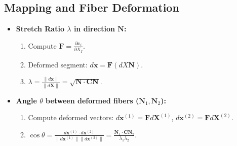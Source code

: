 \documentclass[10pt,twocolumn, a4paper]{article}
\begin{document}
\subsection{Mapping and Fiber Deformation}
\begin{itemize}
    \item \textbf{Stretch Ratio $\lambda$ in direction $\bm{N}$:}
    \begin{enumerate}
        \item Compute $\bm{F} = \frac{\partial x_i}{\partial X_I}$.
        \item Deformed segment: $d\bm{x} = \bm{F} (dX \bm{N})$.
        \item $\lambda = \frac{\|d\bm{x}\|}{\|d\bm{X}\|} = \sqrt{\bm{N} \cdot \bm{C} \bm{N}}$.
    \end{enumerate}
    \item \textbf{Angle $\theta$ between deformed fibers ($\bm{N}_1, \bm{N}_2$):}
    \begin{enumerate}
        \item Compute deformed vectors: $d\bm{x}^{(1)} = \bm{F} d\bm{X}^{(1)}$, $d\bm{x}^{(2)} = \bm{F} d\bm{X}^{(2)}$.
        \item $\cos \theta = \frac{d\bm{x}^{(1)} \cdot d\bm{x}^{(2)}}{\|d\bm{x}^{(1)}\| \|d\bm{x}^{(2)}\|} = \frac{\bm{N}_1 \cdot \bm{C} \bm{N}_2}{\lambda_1 \lambda_2}$.
    \end{enumerate}
\end{itemize}
\end{document}
